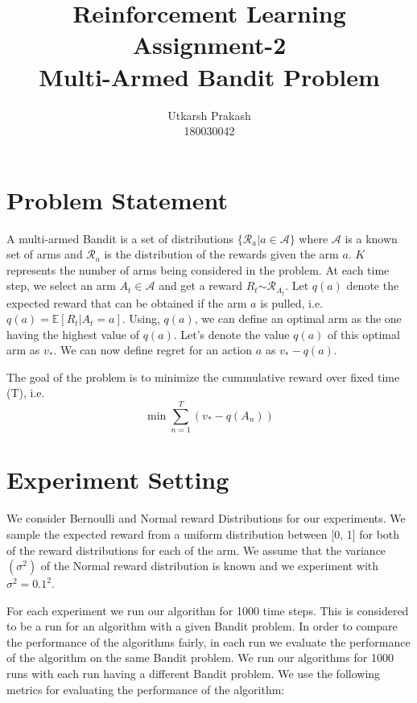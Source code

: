 \documentclass{article}
\title{Reinforcement Learning Assignment-2 \\
	\Large Multi-Armed Bandit Problem \\}
\begin{document}
\author{Utkarsh Prakash \\ \normalsize 180030042}
\maketitle
\section{Problem Statement}
	A multi-armed Bandit is a set of distributions $\{\mathcal{R}_{a} | a \in \mathcal{A}\}$ where $\mathcal{A}$ is a known set of arms and $\mathcal{R}_{a}$ is the
	distribution of the rewards given the arm $a$. $K$ represents the number of arms being considered in the problem. At each time step, we select an arm 
	$A_{t} \in \mathcal{A}$ and get a reward $R_{t} \stackrel{}{\sim}
	\mathcal{R}_{A_{t}}$. Let $q(a)$ denote the expected reward that can be obtained if the arm $a$ is pulled, i.e. $q(a) = \mathbb{E}[R_{t} | A_{t} = a]$. Using,
	$q(a)$, we can define an optimal arm as the one having the highest value of $q(a)$. Let's denote the value $q(a)$ of this optimal arm as $v_{*}$. We can now 
	define regret for an action $a$ as $v_{*} - q(a)$. \par

	\noindent %
	The goal of the problem is to minimize the cummulative reward over fixed time (T), i.e.
	\begin{equation}
	\nonumber
		\min \sum_{n=1}^{T} (v_{*} - q(A_{n}))
	\end{equation}
\section{Experiment Setting}
	We consider Bernoulli and Normal reward Distributions for our experiments. We sample the expected reward from a uniform distribution between [0, 1] for both of the  
	reward distributions for each of the arm. We assume that the variance $(\sigma^{2})$ of the Normal reward distribution is known and we experiment with $\sigma^{2} = 0.1^{2}$. \par
	
	\noindent %
	For each experiment we run our algorithm for 1000 time steps. This is considered to be a run for an algorithm with a given Bandit problem. In order to compare
	the performance of the algorithms fairly, in each run we evaluate the performance of the algorithm on the same Bandit problem. We run our algorithms for 1000
	runs with each run having a different Bandit problem. We use the following metrics for evaluating the performance of the algorithm:
	
\end{document}

